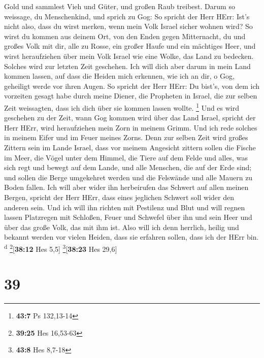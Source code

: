 Gold und sammlest Vieh und Güter, und großen Raub treibest.
 Darum so weissage, du Menschenkind, und sprich zu Gog:
So spricht der Herr HErr: Ist's nicht also, dass du wirst merken, wenn
mein Volk Israel sicher wohnen wird?  So wirst du kommen
aus deinem Ort, von den Enden gegen Mitternacht, du und großes Volk mit
dir, alle zu Rosse, ein großer Haufe und ein mächtiges Heer,
 und wirst heraufziehen über mein Volk Israel wie eine
Wolke, das Land zu bedecken. Solches wird zur letzten Zeit geschehen.
Ich will dich aber darum in mein Land kommen lassen, auf dass die Heiden
mich erkennen, wie ich an dir, o Gog, geheiligt werde vor ihren Augen.
 So spricht der Herr HErr: Du bist's, von dem ich
vorzeiten gesagt habe durch meine Diener, die Propheten in Israel, die
zur selben Zeit weissagten, dass ich dich über sie kommen lassen wollte.
\footnote{\textbf{43:7} Ps 132,13-14}  Und es wird
geschehen zu der Zeit, wann Gog kommen wird über das Land Israel,
spricht der Herr HErr, wird heraufziehen mein Zorn in meinem Grimm.
 Und ich rede solches in meinem Eifer und im Feuer meines
Zorns. Denn zur selben Zeit wird großes Zittern sein im Lande Israel,
 dass vor meinem Angesicht zittern sollen die Fische im
Meer, die Vögel unter dem Himmel, die Tiere auf dem Felde und alles, was
sich regt und bewegt auf dem Lande, und alle Menschen, die auf der Erde
sind; und sollen die Berge umgekehret werden und die Felswände und alle
Mauern zu Boden fallen.  Ich will aber wider ihn
herbeirufen das Schwert auf allen meinen Bergen, spricht der Herr HErr,
dass eines jeglichen Schwert soll wider den anderen sein.
 Und ich will ihn richten mit Pestilenz und Blut und will
regnen lassen Platzregen mit Schloßen, Feuer und Schwefel über ihn und
sein Heer und über das große Volk, das mit ihm ist.  Also
will ich denn herrlich, heilig und bekannt werden vor vielen Heiden,
dass sie erfahren sollen, dass ich der HErr bin. \textsuperscript{d}
\footnote{\textbf{39:25} Hes 16,53-63}{[}\textbf{38:12} Hes 5,5{]}
\footnote{\textbf{43:8} Hes 8,7-18}{[}\textbf{38:23} Hes 29,6{]}

\hypertarget{section-38}{%
\section{39}\label{section-38}}

